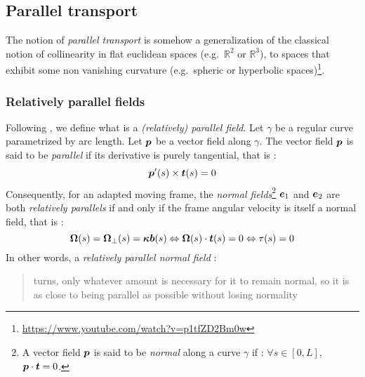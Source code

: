 \subsection{Parallel transport}\label{sec:paralleltransport}
The notion of \emph{parallel transport} is somehow a generalization of the classical notion of collinearity in flat euclidean spaces (e.g.\ $\mathbb{R}^2$ or $\mathbb{R}^3$), to spaces that exhibit some non vanishing curvature (e.g.\ spheric or hyperbolic spaces)\footnote{\url{https://www.youtube.com/watch?v=p1tfZD2Bm0w}}.

\subsubsection{Relatively parallel fields}
Following \cite{Bishop1975}, we define what is a \emph{(relatively) parallel field}. Let $\gamma$ be a regular curve parametrized by arc length. Let $\boldsymbol{p}$ be a vector field along $\gamma$. The vector field $\boldsymbol{p}$ is said to be \emph{parallel} if its derivative is purely tangential, that is :
\begin{equation}
	\boldsymbol{p}'(s) \times \boldsymbol{t}(s) = 0
\end{equation}
Consequently, for an adapted moving frame, the \emph{normal fields}\footnote{
A vector field $\boldsymbol{p}$ is said to be \emph{normal} along a curve $\gamma$ if : $\forall s \in [0,L]$, $\boldsymbol{p}\cdot\boldsymbol{t} = 0$.
} $\boldsymbol{e}_1$ and $\boldsymbol{e}_2$ are both \emph{relatively parallels} if and only if the frame angular velocity is itself a normal field, that is :
\begin{equation}
	\boldsymbol{\Omega}(s) = \boldsymbol{\Omega}_{\perp}(s) =  \boldsymbol{\kappa b}(s) \Leftrightarrow \boldsymbol{\Omega}(s) \cdot \boldsymbol{t}(s) = 0  \Leftrightarrow \tau(s) = 0  
\end{equation}
In other words, a \emph{relatively parallel normal field} : \blockcquote{Bishop1975}{turns, only whatever amount is necessary for it to remain normal, so it is as close to being parallel as possible without losing normality}. 
%

